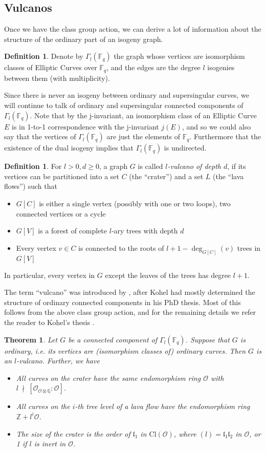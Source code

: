 \documentclass{ociamthesis}
\newcommand{\Z}{\mathbb{Z}}
\newcommand{\Q}{\mathbb{Q}}
\newcommand{\F}{\mathbb{F}}
\newcommand{\notdivides}{\ \nmid \ }
\newcommand{\Cl}{\mathrm{Cl}}
\renewcommand{\l}{\mathfrak{l}}
\renewcommand{\O}{\mathcal{O}}
\newtheorem{theorem}[prop]{Theorem}
\theoremstyle{definition}
\newtheorem{definition}[prop]{Definition}
\begin{document}
\subsection{Vulcanos}
Once we have the class group action, we can derive a lot of information about the structure of the ordinary part of an isogeny graph.
\begin{definition}
    Denote by $\Gamma_l(\F_q)$ the graph whose vertices are isomorphism classes of Elliptic Curves over $\F_q$, and the edges are the degree $l$ isogenies between them (with multiplicity).
\end{definition}
Since there is never an isogeny between ordinary and supersingular curves, we will continue to talk of ordinary and supersingular connected components of $\Gamma_l(\F_q)$.
Note that by the j-invariant, an isomorphism class of an Elliptic Curve $E$ is in 1-to-1 correspondence with the j-invariant $j(E)$, and so we could also say that the vertices of $\Gamma_l(\F_q)$ are just the elements of $\F_q$.
Furthermore that the existence of the dual isogeny implies that $\Gamma_l(\F_q)$ is undirected.
\begin{definition}
    For $l > 0, d \geq 0$, a graph $G$ is called \emph{$l$-vulcano of depth $d$}, if its vertices can be partitioned into a set $C$ (the ``crater'') and a set $L$ (the ``lava flows'') such that
    \begin{itemize}
        \item $G[C]$ is either a single vertex (possibly with one or two loops), two connected vertices or a cycle
        \item $G[V]$ is a forest of complete $l$-ary trees with depth $d$
        \item Every vertex $v \in C$ is connected to the roots of $l + 1 - \deg_{G[C]}(v)$ trees in $G[V]$
    \end{itemize}
    In particular, every vertex in $G$ except the leaves of the trees has degree $l + 1$.
\end{definition}
The term ``vulcano'' was introduced by \cite{isogeny_vulcano}, after Kohel had mostly determined the structure of ordinary connected components in his PhD thesis.
Most of this follows from the above class group action, and for the remaining details we refer the reader to Kohel's thesis \cite[Prop.~23]{kohel}.
\begin{theorem}
    \label{prop:isogeny_vulcano}
    Let $G$ be a connected component of $\Gamma_l(\F_q)$.
    Suppose that $G$ is ordinary, i.e. its vertices are (isomorphism classes of) ordinary curves.
    Then $G$ is an $l$-vulcano.
    Further, we have
    \begin{itemize}
        \item All curves on the crater have the same endomorphism ring $\O$ with $l \notdivides [\O_{\O \otimes \Q} : \O]$.
        \item All curves on the $i$-th tree level of a lava flow have the endomorphism ring $\Z + l^i\O$.
        \item The size of the crater is the order of $\l_1$ in $\Cl(\O)$, where $(l) = \l_1\l_2$ in $\O$, or 1 if $l$ is inert in $\O$.
    \end{itemize} 
\end{theorem}
\end{document}
